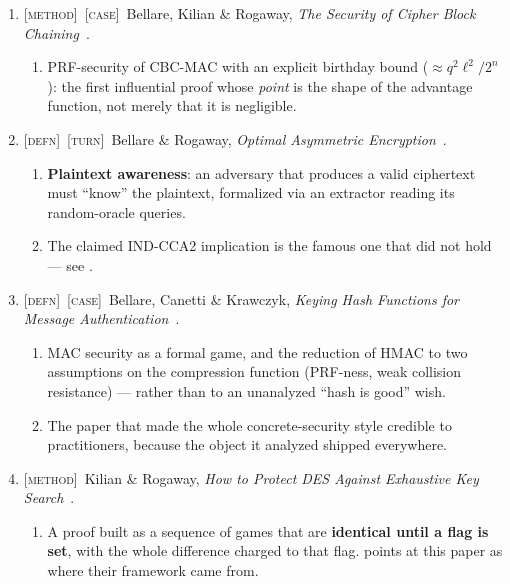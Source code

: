 \documentclass[11pt]{article}
\newcommand{\kind}[1]{{\footnotesize\textsc{\textcolor{yearcolor}{[#1]}}}\ }
\newcommand{\defn}{\kind{defn}}
\newcommand{\method}{\kind{method}}
\newcommand{\turn}{\kind{turn}}
\newcommand{\case}{\kind{case}}
\newcommand{\paper}[3]{#1, \emph{#2}~\cite{#3}.}
\begin{document}
\begin{enumerate}
  \item \method\case \paper{Bellare, Kilian \& Rogaway}{The Security of Cipher
    Block Chaining}{BKR94}
    \begin{enumerate}
      \item PRF-security of CBC-MAC with an explicit birthday bound
        ($\approx q^2\ell^2/2^n$): the first influential proof whose \emph{point}
        is the shape of the advantage function, not merely that it is negligible.
    \end{enumerate}

  \item \defn\turn \paper{Bellare \& Rogaway}{Optimal Asymmetric Encryption}
    {BR94}
    \begin{enumerate}
      \item \textbf{Plaintext awareness}: an adversary that produces a valid
        ciphertext must ``know'' the plaintext, formalized via an extractor
        reading its random-oracle queries.
      \item The claimed IND-CCA2 implication is the famous one that did not
        hold --- see \cite{Shou01}.
    \end{enumerate}

  \item \defn\case \paper{Bellare, Canetti \& Krawczyk}{Keying Hash Functions
    for Message Authentication}{BCK96}
    \begin{enumerate}
      \item MAC security as a formal game, and the reduction of HMAC to two
        assumptions on the compression function (PRF-ness, weak collision
        resistance) --- rather than to an unanalyzed ``hash is good'' wish.
      \item The paper that made the whole concrete-security style credible to
        practitioners, because the object it analyzed shipped everywhere.
    \end{enumerate}

  \item \method \paper{Kilian \& Rogaway}{How to Protect DES Against Exhaustive
    Key Search}{KR96}
    \begin{enumerate}
      \item A proof built as a sequence of games that are \textbf{identical
        until a flag is set}, with the whole difference charged to that flag.
        \cite{BR04} points at this paper as where their framework came from.
    \end{enumerate}


\end{enumerate}
\end{document}
